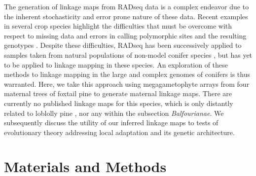 \documentclass[smallextended]{svjour3}
\begin{document}
The generation of linkage maps from RADseq data is a complex endeavor due to the
inherent stochasticity and error prone nature of these data. Recent examples in
several crop species highlight the difficulties that must be overcome with
respect to missing data and errors in calling polymorphic sites and the
resulting genotypes \citep{Pfender:2011, Ward:2013}. Despite these difficulties,
RADseq has been successively applied to samples taken from natural populations
of non-model conifer species \citep{Parchman:2012}, but has yet to be applied to
linkage mapping in these species. An exploration of these methods to
linkage mapping in the large and complex genomes of conifers is thus warranted. Here,
we take this approach using megagametophyte arrays from four maternal trees of
foxtail pine to generate maternal linkage maps. There are currently no published
linkage maps for this species, which is only distantly related to loblolly pine
\citep{Eckert:2006a}, nor any within the subsection \textit{Balfourianae}.  We
subsequently discuss the utility of our inferred linkage maps to tests of
evolutionary theory addressing local adaptation and its genetic architecture.


\section*{Materials and Methods}\label{ss:mats}
\end{document}
